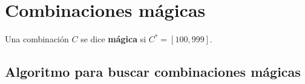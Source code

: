 \section{Combinaciones mágicas}

\begin{definition}
  Una combinación $C$ se dice \textbf{mágica} si $C^{\ast} = [100,999]$.
\end{definition}
\subsection{Algoritmo para buscar combinaciones mágicas}
